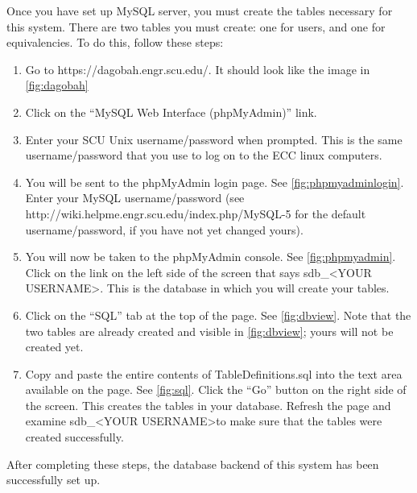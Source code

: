 \documentclass{article}
\begin{document}
\par Once you have set up MySQL server, you must create the tables necessary for
this system.  There are two tables you must create: one for users, and one for
equivalencies.  To do this, follow these steps:
\begin{enumerate}
\item Go to https://dagobah.engr.scu.edu/.  It should look like the image in
\cref{fig:dagobah}
\item Click on the ``MySQL Web Interface (phpMyAdmin)'' link.
\item Enter your SCU Unix username/password when prompted. This is the same
username/password that you use to log on to the ECC linux computers.
\item You will be sent to the phpMyAdmin login page. See \cref{fig:phpmyadminlogin}.
Enter your MySQL
username/password (see http://wiki.helpme.engr.scu.edu/index.php/MySQL-5 for
the default username/password, if you have not yet changed yours).
\item You will now be taken to the phpMyAdmin console. See \cref{fig:phpmyadmin}.
Click on the link on the left side of the screen that says sdb\_\textless YOUR
USERNAME\textgreater .
This is the database in which you will create your tables.
\item Click on the ``SQL'' tab at the top of the page. See \cref{fig:dbview}. Note
that the two tables are already created and visible in \cref{fig:dbview}; yours will not be
created yet.
\item Copy and paste the entire contents of TableDefinitions.sql into the text
area available on the page. See \cref{fig:sql}.  Click the ``Go'' button on the
right side of the screen.  This creates the tables in your database.  Refresh
the page and examine sdb\_\textless YOUR USERNAME\textgreater  to make sure that
the tables were
created successfully.
\end{enumerate}
\par After completing these steps, the database backend of this system has been
successfully set up.
\end{document}
